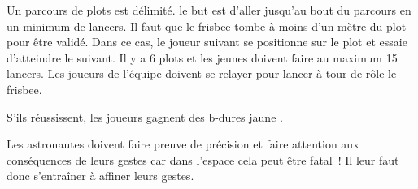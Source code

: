 \documentclass{grand-jeu}
\begin{document}
\begin{liste-materiel}
\end{liste-materiel}

\begin{regles}
Un parcours de plots est délimité. le but est d'aller jusqu'au bout du parcours en un minimum de lancers. 
Il faut que le frisbee tombe à moins d'un mètre du plot pour être validé. Dans ce cas, le joueur suivant se positionne sur le plot et essaie d'atteindre le suivant.
Il y a 6 plots et les jeunes doivent faire au maximum 15 lancers. 
Les joueurs de l'équipe doivent se relayer pour lancer à tour de rôle le frisbee. 

S’ils réussissent, les joueurs gagnent des b-dures jaune . 
\end{regles}

\begin{imaginaire}
Les astronautes doivent faire preuve de précision et faire attention aux conséquences de leurs gestes car dans l'espace cela peut être fatal ! Il leur faut donc s'entraîner à affiner leurs gestes. 
\end{imaginaire}

\begin{moments-stop}
\end{moments-stop}
\end{document}
